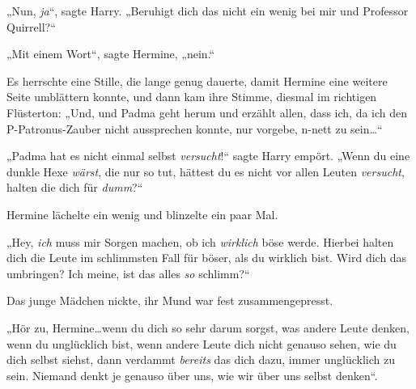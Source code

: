 „Nun, \emph{ja}“, sagte Harry. „Beruhigt dich das nicht ein wenig bei mir und Professor Quirrell?“

„Mit einem Wort“, sagte Hermine, „nein.“

Es herrschte eine Stille, die lange genug dauerte, damit Hermine eine weitere Seite umblättern konnte, und dann kam ihre Stimme, diesmal im richtigen Flüsterton: „Und, und Padma geht herum und erzählt allen, dass ich, da ich den P-Patronus-Zauber nicht aussprechen konnte, nur vorgebe, n-nett zu sein…“

„Padma hat es nicht einmal selbst \emph{versucht}!“ sagte Harry empört. „Wenn du eine dunkle Hexe \emph{wärst}, die nur so tut, hättest du es nicht vor allen Leuten \emph{versucht}, halten die dich für \emph{dumm}?“

Hermine lächelte ein wenig und blinzelte ein paar Mal.

„Hey, \emph{ich} muss mir Sorgen machen, ob ich \emph{wirklich} böse werde. Hierbei halten dich die Leute im schlimmsten Fall für böser, als du wirklich bist. Wird dich das umbringen? Ich meine, ist das alles \emph{so} schlimm?“

Das junge Mädchen nickte, ihr Mund war fest zusammengepresst.

„Hör zu, Hermine…wenn du dich so sehr darum sorgst, was andere Leute denken, wenn du unglücklich bist, wenn andere Leute dich nicht genauso sehen, wie du dich selbst siehst, dann verdammt \emph{bereits} das dich dazu, immer unglücklich zu sein. Niemand denkt je genauso über uns, wie wir über uns selbst denken“.

